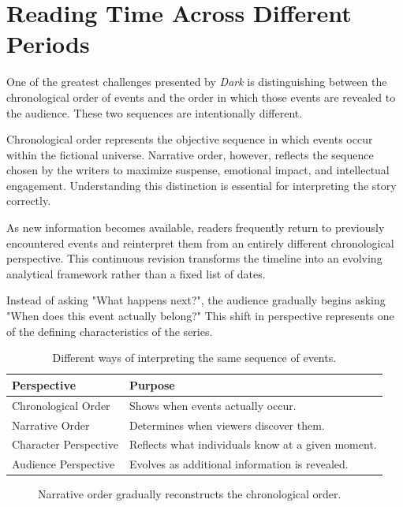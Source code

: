 \documentclass[12pt,oneside,openany]{book}
\begin{document}
\section{Reading Time Across Different Periods}

One of the greatest challenges presented by \textit{Dark} is distinguishing
between the chronological order of events and the order in which those events
are revealed to the audience. These two sequences are intentionally different.

Chronological order represents the objective sequence in which events occur
within the fictional universe. Narrative order, however, reflects the sequence
chosen by the writers to maximize suspense, emotional impact, and intellectual
engagement. Understanding this distinction is essential for interpreting the
story correctly.

As new information becomes available, readers frequently return to previously
encountered events and reinterpret them from an entirely different
chronological perspective. This continuous revision transforms the timeline
into an evolving analytical framework rather than a fixed list of dates.

Instead of asking "What happens next?", the audience gradually begins asking
"When does this event actually belong?" This shift in perspective represents
one of the defining characteristics of the series.

\begin{table}[H]
\centering
\begin{tabular}{|p{4cm}|p{8cm}|}
\hline
\textbf{Perspective} & \textbf{Purpose}\\
\hline
Chronological Order & Shows when events actually occur.\\
\hline
Narrative Order & Determines when viewers discover them.\\
\hline
Character Perspective & Reflects what individuals know at a given moment.\\
\hline
Audience Perspective & Evolves as additional information is revealed.\\
\hline
\end{tabular}
\caption{Different ways of interpreting the same sequence of events.}
\end{table}

\begin{figure}[H]
\centering
{}
\caption{Narrative order gradually reconstructs the chronological order.}
\end{figure}
\end{document}
